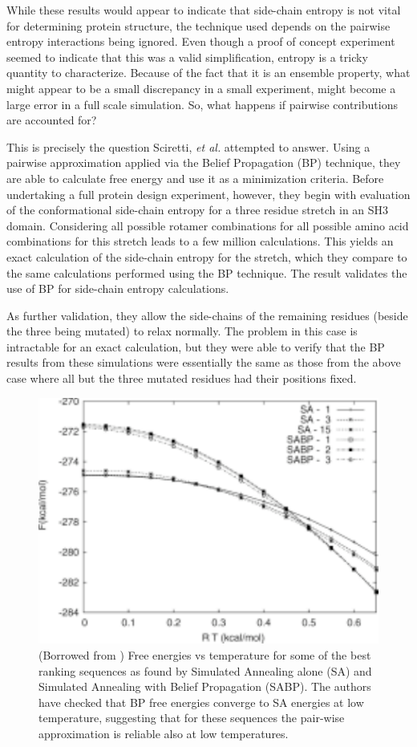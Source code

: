 While these results would appear to indicate that side-chain entropy is not vital for determining protein structure, the technique used depends on the pairwise entropy interactions being ignored. Even though a proof of concept experiment seemed to indicate that this was a valid simplification, entropy is a tricky quantity to characterize. Because of the fact that it is an ensemble property, what might appear to be a small discrepancy in a small experiment, might become a large error in a full scale simulation. So, what happens if pairwise contributions are accounted for?

This is precisely the question Sciretti, \emph{et al.} attempted to answer\cite{Sciretti:2008p361}. Using a pairwise approximation applied via the Belief Propagation (BP) technique, they are able to calculate free energy and use it as a minimization criteria. Before undertaking a full protein design experiment, however, they begin with evaluation of the conformational side-chain entropy for a three residue stretch in an SH3 domain. Considering all possible rotamer combinations for all possible amino acid combinations for this stretch leads to a few million calculations. This yields an exact calculation of the side-chain entropy for the stretch, which they compare to the same calculations performed using the BP technique. The result validates the use of BP for side-chain entropy calculations.

As further validation, they allow the side-chains of the remaining residues (beside the three being mutated) to relax normally. The problem in this case is intractable for an exact calculation, but they were able to verify that the BP results from these simulations were essentially the same as those from the above case where all but the three mutated residues had their positions fixed. 

\begin{figure}[h]
	\center
	\includegraphics{BP_vs_SA}
	\caption{(Borrowed from \cite{Sciretti:2008p361}) Free energies vs temperature for some of the best ranking sequences as found by Simulated Annealing alone (SA) and Simulated Annealing with Belief Propagation (SABP). The authors have checked that BP free energies converge to SA energies at low temperature, suggesting that for these sequences the pair-wise approximation is reliable also at low temperatures.}
	\label{fig:BP_vs_SA}
\end{figure}